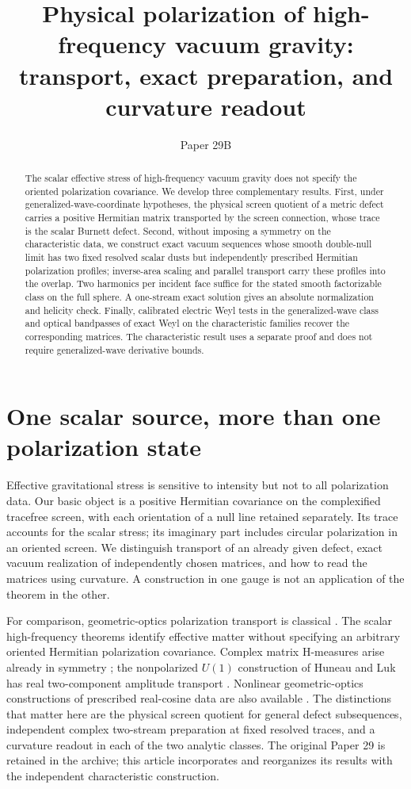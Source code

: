 \documentclass[11pt]{article}
\title{Physical polarization of high-frequency vacuum gravity:\\
transport, exact preparation, and curvature readout}
\author{}
\date{Paper 29B}
\begin{document}
\maketitle
\begin{abstract}
The scalar effective stress of high-frequency vacuum gravity does not specify the oriented polarization covariance. We develop three complementary results. First, under generalized-wave-coordinate hypotheses, the physical screen quotient of a metric defect carries a positive Hermitian matrix transported by the screen connection, whose trace is the scalar Burnett defect. Second, without imposing a symmetry on the characteristic data, we construct exact vacuum sequences whose smooth double-null limit has two fixed resolved scalar dusts but independently prescribed Hermitian polarization profiles; inverse-area scaling and parallel transport carry these profiles into the overlap. Two harmonics per incident face suffice for the stated smooth factorizable class on the full sphere. A one-stream exact solution gives an absolute normalization and helicity check. Finally, calibrated electric Weyl tests in the generalized-wave class and optical bandpasses of exact Weyl on the characteristic families recover the corresponding matrices. The characteristic result uses a separate proof and does not require generalized-wave derivative bounds.
\end{abstract}

\section{One scalar source, more than one polarization state}
Effective gravitational stress is sensitive to intensity but not to all polarization data. Our basic object is a positive Hermitian covariance on the complexified tracefree screen, with each orientation of a null line retained separately. Its trace accounts for the scalar stress; its imaginary part includes circular polarization in an oriented screen. We distinguish transport of an already given defect, exact vacuum realization of independently chosen matrices, and how to read the matrices using curvature. A construction in one gauge is not an application of the theorem in the other.

For comparison, geometric-optics polarization transport is classical \cite{Isaacson,Dolan,AJ}. The scalar high-frequency theorems \cite{Burnett,HL,LR} identify effective matter without specifying an arbitrary oriented Hermitian polarization covariance. Complex matrix H-measures arise already in symmetry \cite{GTC}; the nonpolarized $U(1)$ construction of Huneau and Luk has real two-component amplitude transport \cite{HLU}. Nonlinear geometric-optics constructions of prescribed real-cosine data are also available \cite{Touati,Multi}. The distinctions that matter here are the physical screen quotient for general defect subsequences, independent complex two-stream preparation at fixed resolved traces, and a curvature readout in each of the two analytic classes. The original Paper 29 is retained in the archive; this article incorporates and reorganizes its results with the independent characteristic construction.
\end{document}
